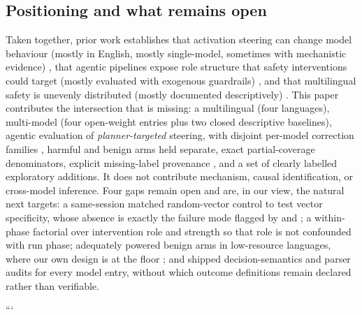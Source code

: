 \subsection{Positioning and what remains open}

Taken together, prior work establishes that activation steering can change model
behaviour (mostly in English, mostly single-model, sometimes with mechanistic
evidence) \citep{turner2023activation,rimsky2024steering,arditi2024refusal},
that agentic pipelines expose role structure that safety interventions could
target (mostly evaluated with exogenous guardrails)
\citep{yao2023react,ruan2024toolemu,andriushchenko2025agentharm}, and that
multilingual safety is unevenly distributed (mostly documented descriptively)
\citep{yong2024lowresource,deng2024multilingual,wang2024all}. This paper
contributes the intersection that is missing: a multilingual (four languages),
multi-model (four open-weight entries plus two closed descriptive baselines),
agentic evaluation of \emph{planner-targeted} steering, with disjoint per-model
correction families \citep{holm1979simple}, harmful and benign arms held
separate, exact partial-coverage denominators, explicit missing-label provenance
\citep{rubin1976inference}, and a set of clearly labelled exploratory additions.
It does not contribute mechanism, causal identification, or cross-model
inference. Four gaps remain open and are, in our view, the natural next targets:
a same-session matched random-vector control to test vector specificity, whose
absence is exactly the failure mode flagged by
\citet{tan2024analysing} and \citet{makelov2024illusion}; a within-phase
factorial over intervention role and strength so that role is not confounded
with run phase; adequately powered benign arms in low-resource languages, where
our own design is at the floor \citep{rottger2024xstest,card2020little}; and
shipped decision-semantics and parser audits for every model entry, without
which outcome definitions remain declared rather than verifiable.

```
